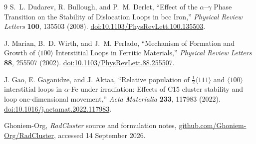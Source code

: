 \documentclass[11pt,a4paper]{article}
\newcommand{\hkl}[1]{\langle #1\rangle}
\newcommand{\half}{\tfrac12}
\begin{document}
\begin{thebibliography}{9}
S.~L. Dudarev, R. Bullough, and P.~M. Derlet,
``Effect of the $\alpha$--$\gamma$ Phase Transition on the Stability of Dislocation Loops in bcc Iron,''
\emph{Physical Review Letters} \textbf{100}, 135503 (2008).
\href{https://doi.org/10.1103/PhysRevLett.100.135503}{doi:10.1103/PhysRevLett.100.135503}.

J. Marian, B.~D. Wirth, and J.~M. Perlado,
``Mechanism of Formation and Growth of $\hkl{100}$ Interstitial Loops in Ferritic Materials,''
\emph{Physical Review Letters} \textbf{88}, 255507 (2002).
\href{https://doi.org/10.1103/PhysRevLett.88.255507}{doi:10.1103/PhysRevLett.88.255507}.

J. Gao, E. Gaganidze, and J. Aktaa,
``Relative population of $\half\hkl{111}$ and $\hkl{100}$ interstitial loops in $\alpha$-Fe under irradiation: Effects of C15 cluster stability and loop one-dimensional movement,''
\emph{Acta Materialia} \textbf{233}, 117983 (2022).
\href{https://doi.org/10.1016/j.actamat.2022.117983}{doi:10.1016/j.actamat.2022.117983}.

Ghoniem-Org, \emph{RadCluster} source and formulation notes,
\href{https://github.com/Ghoniem-Org/RadCluster}{github.com/Ghoniem-Org/RadCluster}, accessed 14 September 2026.
\end{thebibliography}
\end{document}
